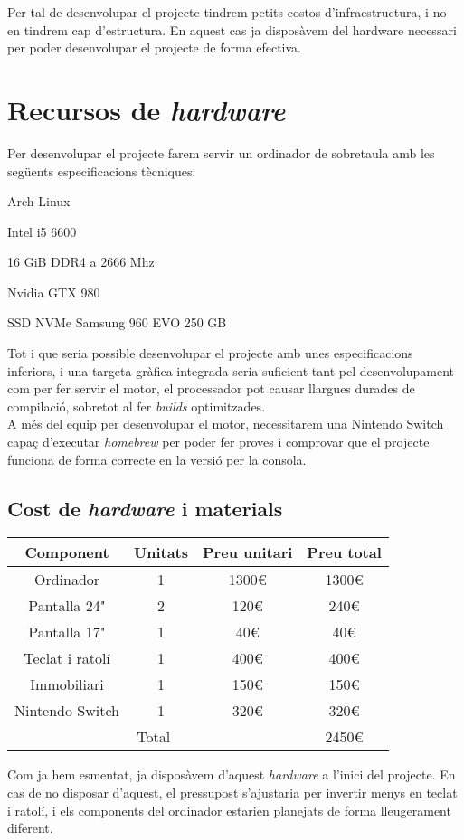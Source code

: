 Per tal de desenvolupar el projecte tindrem petits costos d'infraestructura, i no en tindrem cap d'estructura. En aquest cas ja disposàvem del hardware necessari per poder desenvolupar el projecte de forma efectiva.
\section{Recursos de \textit{hardware}}
Per desenvolupar el projecte farem servir un ordinador de sobretaula amb les següents especificacions tècniques:
\begin{description}[font=$\bullet$~\normalfont\scshape\textbf]
\item [Sistema Operatiu:] Arch Linux
\item [Processador:] Intel i5 6600
\item [Memòria RAM:] 16 GiB DDR4 a 2666 Mhz
\item [Targeta gràfica:] Nvidia GTX 980
\item [Emmagatzematge:] SSD NVMe Samsung 960 EVO 250 GB
\end{description}
Tot i que seria possible desenvolupar el projecte amb unes especificacions inferiors, i una targeta gràfica integrada seria suficient tant pel desenvolupament com per fer servir el motor, el processador pot causar llargues durades de compilació, sobretot al fer \textit{builds} optimitzades.
\\
A més del equip per desenvolupar el motor, necessitarem una Nintendo Switch capaç d'executar \textit{homebrew} per poder fer proves i comprovar que el projecte funciona de forma correcte en la versió per la consola.
\subsection{Cost de \textit{hardware} i materials}
\hfill
\begin{center}
  \begin{tabular}{|c|c|c|c|}
    \hline
    Component & Unitats & Preu unitari & Preu total \\
    \hline \hline
    Ordinador & 1 & 1300€ & 1300€ \\
    \hline
    Pantalla 24" & 2 & 120€ & 240€ \\
    \hline
    Pantalla 17" & 1 & 40€ & 40€ \\
    \hline
    Teclat i ratolí & 1 & 400€ & 400€ \\
    \hline
    Immobiliari & 1 & 150€ & 150€ \\
    \hline
    Nintendo Switch & 1 & 320€ & 320€ \\
    \hline \hline
    \multicolumn{3}{|c|}{Total} & 2450€ \\
    \hline
  \end{tabular}
\end{center}
Com ja hem esmentat, ja disposàvem d'aquest \textit{hardware} a l'inici del projecte. En cas de no disposar d'aquest, el pressupost s'ajustaria per invertir menys en teclat i ratolí, i els components del ordinador estarien planejats de forma lleugerament diferent.
